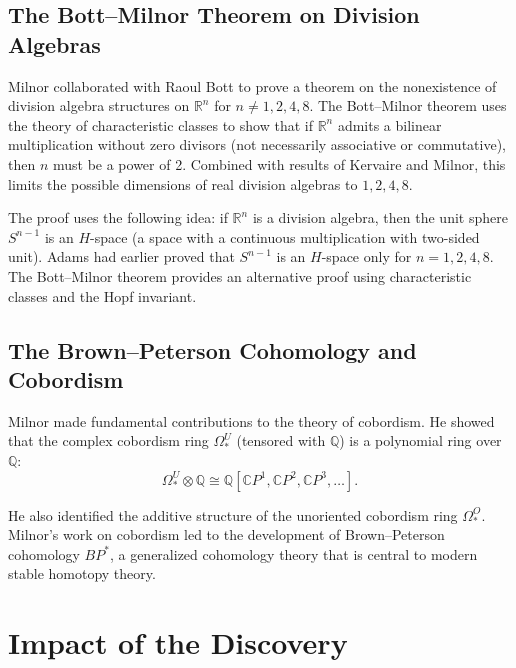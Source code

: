 \subsection{The Bott--Milnor Theorem on Division Algebras}

Milnor collaborated with Raoul Bott to prove a theorem on the nonexistence of division algebra structures on $\mathbb{R}^n$ for $n \neq 1,2,4,8$. The Bott--Milnor theorem uses the theory of characteristic classes to show that if $\mathbb{R}^n$ admits a bilinear multiplication without zero divisors (not necessarily associative or commutative), then $n$ must be a power of 2. Combined with results of Kervaire and Milnor, this limits the possible dimensions of real division algebras to $1,2,4,8$.

The proof uses the following idea: if $\mathbb{R}^n$ is a division algebra, then the unit sphere $S^{n-1}$ is an $H$-space (a space with a continuous multiplication with two-sided unit). Adams had earlier proved that $S^{n-1}$ is an $H$-space only for $n=1,2,4,8$. The Bott--Milnor theorem provides an alternative proof using characteristic classes and the Hopf invariant.

\subsection{The Brown--Peterson Cohomology and Cobordism}

Milnor made fundamental contributions to the theory of cobordism. He showed that the complex cobordism ring $\Omega_*^U$ (tensored with $\mathbb{Q}$) is a polynomial ring over $\mathbb{Q}$:
\[
\Omega_*^U \otimes \mathbb{Q} \cong \mathbb{Q}[\mathbb{C}P^1, \mathbb{C}P^2, \mathbb{C}P^3, \ldots].
\]

He also identified the additive structure of the unoriented cobordism ring $\Omega_*^O$. Milnor's work on cobordism led to the development of Brown--Peterson cohomology $BP^*$, a generalized cohomology theory that is central to modern stable homotopy theory.

\section{Impact of the Discovery}

